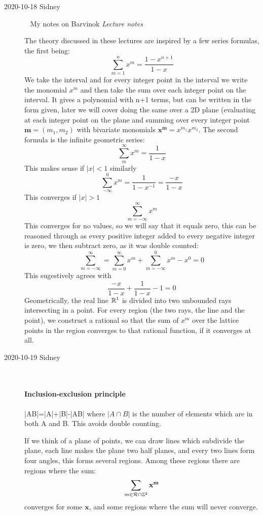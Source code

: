 \begin{description}
\item[2020-10-18 Sidney]~
My notes on Barvinok
{{\em Lecture notes}}

The theory discussed in these lectures are inspired by a few series formulas, the first being:
$$\sum^n_{m=1}x^m=\frac{1-x^{n+1}}{1-x}$$
We take the interval \PCedit{$[0,n)$} and for every integer point
in the interval we write the monomial $x^m$ and then take the sum over
each integer point on the interval. It gives a polynomial with n+1 terms,
but can be written in the form given, later we will cover doing the same
over a 2D plane (evaluating at each integer point on the plane and
summing over every integer point $\mathbf{m}=(m_1,m_2)$ with bivariate
monomials $\mathbf{x}^\mathbf{m}=x^{m_1}x^{m_2}$. The second formula is the
infinite geometric series:
$$\sum^{\infty}_{m}x^m=\frac{1}{1-x}$$
This makes sense if $|x|<1$ similarly
$$\sum^0_{-\infty}x^m=\frac{1}{1-x^{-1}}=\frac{-x}{1-x}$$
This converges if $|x|>1$
$$\sum^{\infty}_{m=-\infty}x^m$$
This converges for no values, so we will say that it equals zero, this can be reasoned through as every positive integer added to every negative integer is zero, we then subtract zero, as it was double counted:
$$\sum^{\infty}_{m=-\infty}=\sum^{\infty}_{m=0}x^m+\sum^{0}_{m=-\infty}x^m-x^0=0$$
This sugestively agrees with
$$\frac{-x}{1-x}+\frac{1}{1-x}-1=0$$
Geometrically, the real line $\mathbb{R}^1$ is divided into two unbounded rays intersecting in a point. For every region (the two rays, the line and the point), we construct a rational so that the sum of $x^m$ over the lattice points in the region converges to that rational function, if it converges at all.

\item[2020-10-19 Sidney]~~

\paragraph{Inclusion-exclusion principle}
\beq
|A\cup B|=|A|+|B|-|A\cap B|
where $|A\cap B|$ is the number of elements
which are in both A and B. This avoids double counting.

If we think of a plane of points, we can draw lines which subdivide the
plane, each line makes the plane two half planes, and every two lines
form four angles, this forms several regions. Among these regions there
are regions {\R} where the sum:
$$\sum_{m\in {\ensuremath{\mathcal{R}}}\cap \mathbb{Z}^2}\mathbf{x}^\mathbf{m}$$
converges for some $\mathbf{x}$, and some regions where the sum will
never converge.


\end{description}
